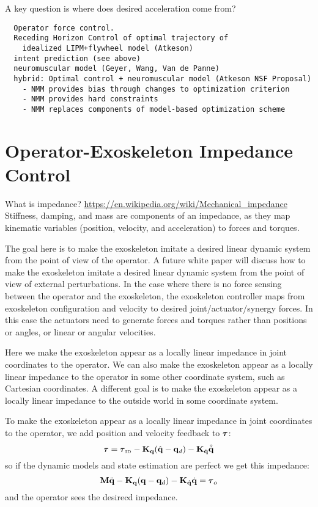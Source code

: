 \documentclass[letterpaper,12pt,fullpage]{article}
\newcommand{\invdyn}{{\mbox {\tiny ID}}}
\begin{document}
A key question is where does desired acceleration come from?
\begin{verbatim}
  Operator force control.
  Receding Horizon Control of optimal trajectory of 
    idealized LIPM+flywheel model (Atkeson)
  intent prediction (see above)
  neuromuscular model (Geyer, Wang, Van de Panne)
  hybrid: Optimal control + neuromuscular model (Atkeson NSF Proposal)
    - NMM provides bias through changes to optimization criterion
    - NMM provides hard constraints
    - NMM replaces components of model-based optimization scheme
\end{verbatim}

\section{Operator-Exoskeleton Impedance Control}

What is impedance?
\url{https://en.wikipedia.org/wiki/Mechanical_impedance}
Stiffness, damping, and mass are components of an impedance, as
they map kinematic variables (position, velocity, and acceleration)
to forces and torques.

The goal here is to make the exoskeleton imitate a desired linear dynamic system
from the point of view of the operator.
A future white paper will discuss how to make the exoskeleton 
imitate a desired linear dynamic system 
from the point of view of external perturbations.
In the case where there is no force sensing between the operator and the
exoskeleton, the exoskeleton controller maps from exoskeleton configuration
and velocity to desired joint/actuator/synergy forces.
In this case the actuators need to generate forces and torques rather than
positions or angles, or linear or angular velocities.

Here we make the exoskeleton appear as a locally linear impedance in joint
coordinates to the operator.
We can also make the exoskeleton appear as a locally linear impedance to the
operator in some other coordinate system, such as Cartesian coordinates.
A different goal is to make the exoskeleton appear as a locally linear impedance to
the outside world in some coordinate system.

To make the exoskeleton appear as a locally linear impedance in joint
coordinates to the operator, we add position and velocity feedback to $\vtau$:
\begin{equation}
\vtau = \vtau_{\invdyn} - \mK_{\vq} ( \hat{\vq} - \vq_d ) - \mK_{\dot{\vq}} \hat{\dot{\vq}}
\label{eq:impedance}
\end{equation}
so if the dynamic models and state estimation are perfect we get this impedance:
\begin{equation}
\mM \ddot{\vq} - \mK_{\vq} ( \vq - \vq_d ) - \mK_{\dot{\vq}} \dot{\vq} = \vtau_o
\end{equation}
and the operator sees the desirecd impedance.
\end{document}
